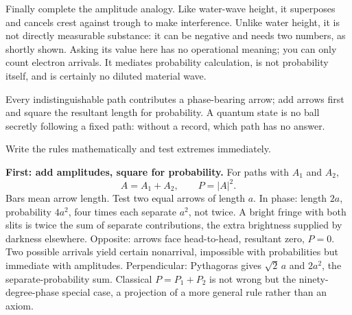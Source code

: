 Finally complete the amplitude analogy. Like water-wave height, it superposes and cancels crest against trough to make interference. Unlike water height, it is not directly measurable substance: it can be negative and needs two numbers, as shortly shown. Asking its value here has no operational meaning; you can only count electron arrivals. It mediates probability calculation, is not probability itself, and is certainly no diluted material wave.


\begin{oneline}
Every indistinguishable path contributes a phase-bearing arrow; add arrows first and square the resultant length for probability. A quantum state is no ball secretly following a fixed path: without a record, which path has no answer.
\end{oneline}


Write the rules mathematically and test extremes immediately.

\textbf{First: add amplitudes, square for probability.} For paths with \(A_1\) and \(A_2\),
\[
A = A_1 + A_2, \qquad P = |A|^2.
\]
Bars mean arrow length. Test two equal arrows of length \(a\). In phase: length \(2a\), probability \(4a^2\), four times each separate \(a^2\), not twice. A bright fringe with both slits is twice the sum of separate contributions, the extra brightness supplied by darkness elsewhere. Opposite: arrows face head-to-head, resultant zero, \(P = 0\). Two possible arrivals yield certain nonarrival, impossible with probabilities but immediate with amplitudes. Perpendicular: Pythagoras gives \(\sqrt{2}\,a\) and \(2a^2\), the separate-probability sum. Classical \(P = P_1 + P_2\) is not wrong but the ninety-degree-phase special case, a projection of a more general rule rather than an axiom.


